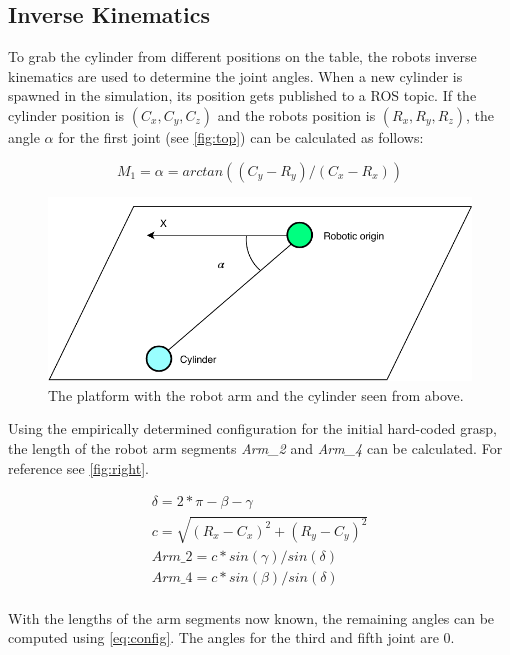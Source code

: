 \subsection{Inverse Kinematics}
To grab the cylinder from different positions on the table, the robots inverse kinematics are used to determine the joint angles.
When a new cylinder is spawned in the simulation, its position gets published to a ROS topic.
If the cylinder position is $(C_x, C_y, C_z)$ and the robots position is $(R_x, R_y, R_z)$, the angle $\alpha$ for the first joint (see \autoref{fig:top}) can be calculated as follows:

\begin{equation}
\label{simple_equation}
M_1=\alpha = arctan((C_y-R_y)/(C_x-R_x))
\end{equation}

\begin{figure}[htpb]
\centering
	\includegraphics[width=0.9\linewidth]{figures/top_view.pdf} 
	\caption{The platform with the robot arm and the cylinder seen from above.}
	\label{fig:top}
\end{figure}

Using the empirically determined configuration for the initial hard-coded grasp, the length of the robot arm segments \textit{Arm\_2} and \textit{Arm\_4} can be calculated.
For reference see \autoref{fig:right}.

\begin{equation}
\begin{aligned}
\delta=2*\pi-\beta-\gamma\\
c=\sqrt{(R_x-C_x)^2+(R_y-C_y)^2}\\
\textit{Arm\_2}=c*sin(\gamma)/sin(\delta)\\
\textit{Arm\_4}=c*sin(\beta)/sin(\delta)\\
\end{aligned}
\end{equation}

With the lengths of the arm segments now known, the remaining angles can be computed using \autoref{eq:config}.
The angles for the third and fifth joint are $0$.

